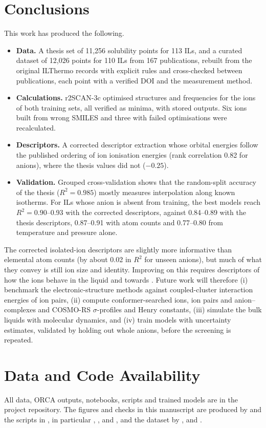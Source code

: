 \section{Conclusions}
\label{sec:summary}

This work has produced the following.
\begin{itemize}
    \item \textbf{Data.} A thesis set of 11,256 \co{} solubility points for 113 ILs, and a curated dataset of 12,026 points for 110 ILs from 167 publications, rebuilt from the original ILThermo records with explicit rules and cross-checked between publications, each point with a verified DOI and the measurement method.
    \item \textbf{Calculations.} r2SCAN-3c optimised structures and frequencies for the ions of both training sets, all verified as minima, with stored outputs. Six ions built from wrong SMILES and three with failed optimisations were recalculated.
    \item \textbf{Descriptors.} A corrected descriptor extraction whose orbital energies follow the published ordering of ion ionisation energies (rank correlation 0.82 for anions), where the thesis values did not ($-0.25$).
    \item \textbf{Validation.} Grouped cross-validation shows that the random-split accuracy of the thesis ($R^2 = 0.985$) mostly measures interpolation along known isotherms. For ILs whose anion is absent from training, the best models reach $R^2 = 0.90$--0.93 with the corrected descriptors, against 0.84--0.89 with the thesis descriptors, 0.87--0.91 with atom counts and 0.77--0.80 from temperature and pressure alone.
\end{itemize}
The corrected isolated-ion descriptors are slightly more informative than elemental atom counts (by about 0.02 in $R^2$ for unseen anions), but much of what they convey is still ion size and identity. Improving on this requires descriptors of how the ions behave in the liquid and towards \co{}. Future work will therefore (i) benchmark the electronic-structure methods against coupled-cluster interaction energies of ion pairs, (ii) compute conformer-searched ions, ion pairs and anion--\co{} complexes and COSMO-RS $\sigma$-profiles and Henry constants, (iii) simulate the bulk liquids with molecular dynamics, and (iv) train models with uncertainty estimates, validated by holding out whole anions, before the screening is repeated.

\section*{Data and Code Availability}
All data, ORCA outputs, notebooks, scripts and trained models are in the project repository. The figures and checks in this manuscript are produced by  and the scripts in , in particular , ,  and , and the dataset by ,  and .
